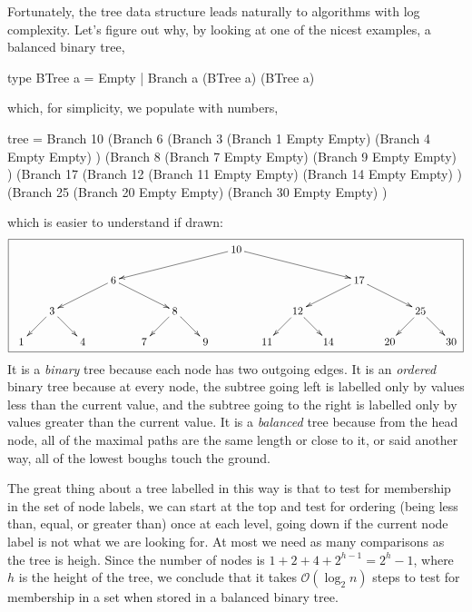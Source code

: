 \documentclass[12pt]{amsbook}
\begin{document}
Fortunately, the tree data structure leads naturally to algorithms with log complexity.
Let's figure out why, by looking at one of the nicest examples,
a balanced binary tree,
\begin{code}
type BTree a = Empty | Branch a (BTree a) (BTree a)
\end{code}
which, for simplicity, we populate with numbers,
\begin{code}
tree = Branch 10 (Branch 6  (Branch 3  (Branch 1 Empty Empty)
                                       (Branch 4 Empty Empty) )
                            (Branch 8  (Branch 7 Empty Empty)
                                       (Branch 9 Empty Empty) )
                 (Branch 17 (Branch 12 (Branch 11 Empty Empty)
                                       (Branch 14 Empty Empty) )
                            (Branch 25 (Branch 20 Empty Empty)
                                       (Branch 30 Empty Empty) )
\end{code}
which is easier to understand if drawn:
\[
\fbox{ \xygraph{
!{<0cm,0cm>;<1cm,0cm>:<0cm,1cm>::}
!{(1,0)}{1}="1"
!{(2,1)}{3}="3"
!{(3,0)}{4}="4"
!{(4,2)}{6}="6"
!{(5,0)}{7}="7"
!{(6,1)}{8}="8"
!{(7,0)}{9}="9"
!{(8,3)}{10}="10"
!{(9,0)}{11}="11"
!{(10,1)}{12}="12"
!{(11,0)}{14}="14"
!{(12,2)}{17}="17"
!{(13,0)}{20}="20"
!{(14,1)}{25}="25"
!{(15,0)}{30}="30"
"10":"6"
"10":"17"
"17":"25"
"17":"12"
"25":"30"
"25":"20"
"12":"14"
"12":"11"
"6":"8"
"8":"7"
"8":"9"
"6":"3"
"3":"1"
"3":"4"
}}
\]
It is a \emph{binary} tree because each node has two outgoing edges.
It is an \emph{ordered} binary tree because at every node, the subtree going left is labelled only by values less than the current value, and the subtree going to the right is labelled only by values greater than the current value.
It is a \emph{balanced} tree because from the head node, all of the maximal paths are the same length or close to it,
or said another way,
all of the lowest boughs touch the ground.

The great thing about a tree labelled in this way is that to test for membership in the set of node labels,
we can start at the top and test for ordering (being less than, equal, or greater than) once at each level, going down if the current node label is not what we are looking for.
At most we need as many comparisons as the tree is heigh.
Since the number of nodes is $1 + 2 + 4 +  2^{h-1} = 2^h - 1$,
where $h$ is the height of the tree, we conclude that
it takes $\mathcal{O}(\log_2 n)$ steps to test for membership
in a set when stored in a balanced binary tree.
\end{document}

